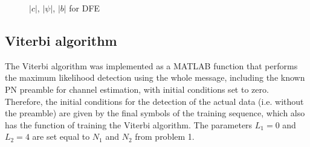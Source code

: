 \documentclass[10pt]{article}
\begin{document}
\begin{figure}[h!]
	\centering
	\caption{$|c|$, $|\psi|$, $|b|$ for DFE}
	\label{fig:DFEcoeff}
\end{figure}

\clearpage

\subsection*{Viterbi algorithm}

The Viterbi algorithm was implemented as a MATLAB function that performs the maximum likelihood detection using the whole message, including the known PN preamble for channel estimation, with initial conditions set to zero. Therefore, the initial conditions for the detection of the actual data (i.e. without the preamble) are given by the final symbols of the training sequence, which also has the function of training the Viterbi algorithm. The parameters $L_1 = 0$ and $L_2 = 4$ are set equal to $N_1$ and $N_2$ from problem 1.
\end{document}
